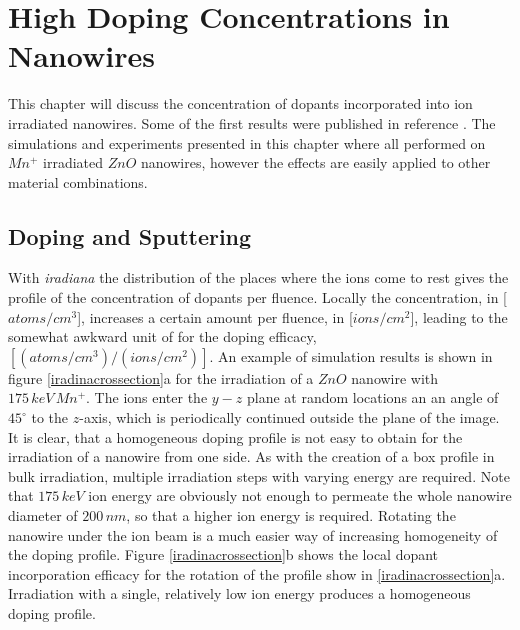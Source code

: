 \chapter{High Doping Concentrations in Nanowires}

This chapter will discuss the concentration of dopants incorporated into ion irradiated nanowires. Some of the first results were published in reference \cite{johannes_enhanced_2014}. The simulations and experiments presented in this chapter where all performed on $Mn^+$ irradiated $ZnO$ nanowires, however the effects are easily applied to other material combinations.

\section{Doping and Sputtering}

With \emph{iradiana} the distribution of the places where the ions come to rest gives the profile of the concentration of dopants per fluence. Locally the concentration, in [$atoms/cm^{3}$], increases a certain amount per fluence, in [$ions/cm^{2}$], leading to the somewhat awkward unit of for the doping efficacy, $[(atoms/cm^{3})/(ions/cm^{2})]$.
An example of simulation results is shown in figure \ref{iradinacrossection}a for the irradiation of a $ZnO$ nanowire with $175\,keV\,Mn^+$. The ions enter the $y-z$ plane at random locations an an angle of $45^\circ$ to the $z$-axis, which is periodically continued outside the plane of the image. It is clear, that a homogeneous doping profile is not easy to obtain for the irradiation of a nanowire from one side. As with the creation of a box profile in bulk irradiation, multiple irradiation steps with varying energy are required. Note that $175\,keV$ ion energy are obviously not enough to permeate the whole nanowire diameter of $200\,nm$, so that a higher ion energy is required. Rotating the nanowire under the ion beam is a much easier way of increasing homogeneity of the doping profile. Figure \ref{iradinacrossection}b shows the local dopant incorporation efficacy for the rotation of the profile show in \ref{iradinacrossection}a. Irradiation with a single, relatively low ion energy produces a homogeneous doping profile. 
  
